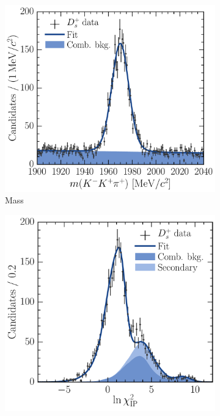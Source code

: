 \begin{figure}
\begin{subfigure}[b]{0.5\textwidth}
    \caption{\lnipchisq}
    \label{fig:prod:fitting:DsToKKpi:ipchisq_high_sig}
  \end{subfigure}
  \begin{subfigure}[b]{0.5\textwidth}
    \centering
    \includegraphics[width=\textwidth]{figures/production/fitting/DsToKKpi_mass_fit_pT_2_y_3}
    \caption{Mass}
    \label{fig:prod:fitting:DsToKKpi:mass_high_bkg}
  \end{subfigure}
  \begin{subfigure}[b]{0.5\textwidth}
    \centering
    \includegraphics[width=\textwidth]{figures/production/fitting/DsToKKpi_ipchisq_fit_pT_2_y_3}

\end{subfigure}
\end{figure}
